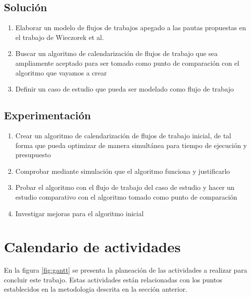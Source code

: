 \documentclass[letterpaper, 12pt]{report}
\begin{document}
\subsection*{Solución}
\begin{enumerate}[resume]
\item Elaborar un modelo de flujos de trabajos apegado a las pautas propuestas en el trabajo de Wieczorek et al. \cite{wieczorek2009towards}
\item Buscar un algoritmo de calendarización de flujos de trabajo que sea ampliamente aceptado para ser tomado como punto de comparación con el algoritmo que vayamos a crear
\item Definir un caso de estudio que pueda ser modelado como flujo de trabajo
\end{enumerate}

\subsection*{Experimentación}
\begin{enumerate}[resume]
\item Crear un algoritmo de calendarización de flujos de trabajo inicial, de tal forma que pueda optimizar de manera simultánea para tiempo de ejecución y presupuesto
\item Comprobar mediante simulación que el algoritmo funciona y justificarlo
\item Probar el algoritmo con el flujo de trabajo del caso de estudio y hacer un estudio comparativo con el algoritmo tomado como punto de comparación
\item Investigar mejoras para el algoritmo inicial
\end{enumerate}

\section*{Calendario de actividades}
En la figura \ref{fig:gantt} se presenta la planeación de las actividades a realizar para concluir este trabajo. Estas actividades están relacionadas con los puntos establecidos en la metodologia descrita en la sección anterior.
\end{document}
